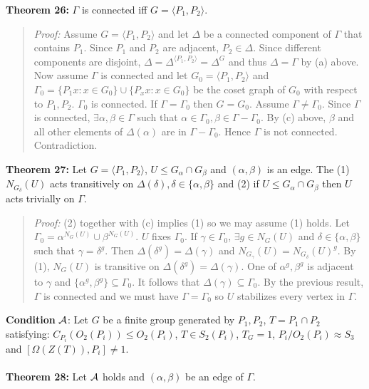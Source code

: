 {\bf Theorem 26:}
$\Gamma$ is connected iff $G= \langle P_1 , P_2 \rangle $.
\begin{quote}
\emph{Proof:}  Assume $G= \langle P_1 , P_2 \rangle$ and let $\Delta$ be a connected component of $\Gamma$ that contains
$P_1$.  Since $P_1$ and $P_2$ are adjacent, $P_2 \in \Delta$.  Since different components are disjoint,
$\Delta = \Delta^{\langle P_1, P_2 \rangle}= \Delta^G$ and thus $\Delta= \Gamma$ by (a) above.
Now assume $\Gamma$ is connected and let $G_0= \langle P_1, P_2 \rangle$ and $\Gamma_0= \{ P_1x: x \in G_0 \} \cup \{ P_xx: x \in G_0 \} $ be the coset graph of $G_0$ with respect to
$P_1, P_2$.  $\Gamma_0$ is connected.  If $\Gamma= \Gamma_0$ then $G= G_0$.  Assume $\Gamma \neq \Gamma_0$.
Since $\Gamma$ is connected, $\exists \alpha, \beta \in \Gamma$ such that $\alpha \in \Gamma_0, \beta \in \Gamma
- \Gamma_0$.  By (c) above, $\beta$ and all other elements of $\Delta( \alpha )$ are in $\Gamma - \Gamma_0$.
Hence $\Gamma$ is not connected.  Contradiction.
\end{quote}
{\bf Theorem 27:}
Let $G= \langle P_1, P_2 \rangle $, $U \le G_{\alpha} \cap G_{\beta}$ and
$(\alpha, \beta)$ is an edge.  The (1) $N_{G_{\delta}}(U)$ acts transitively on
$\Delta(\delta), \delta \in \{ \alpha , \beta \}$ and (2) if $U \le G_{\alpha} \cap G_{\beta}$ then
$U$ acts trivially on $\Gamma$.
\begin{quote}
\emph{Proof:}  (2) together with (c) implies (1) so we may assume (1) holds.
Let $\Gamma_0= \alpha^{N_G(U)} \cup \beta^{N_G(U)}$.  $U$ fixes $\Gamma_0$.
If $\gamma \in \Gamma_0$, $\exists g \in N_G(U)$ and $\delta \in \{ \alpha, \beta \}$ such that
$\gamma= \delta^g$.  Then $\Delta( \delta^g ) = \Delta ( \gamma )$ and $N_{G_{\gamma}}(U)= N_{G_{\delta}}(U)^g $.  By (1), $N_G(U)$ is transitive on $\Delta( \delta^g ) = \Delta( \gamma )$.
One of $\alpha^g, \beta^g$ is adjacent to $\gamma$ and $\{ \alpha^g , \beta^g \} \subseteq \Gamma_0$.
It follows that $\Delta( \gamma ) \subseteq \Gamma_0$.  By the previous result, $\Gamma$ is connected
and we must have $\Gamma= \Gamma_0$ so $U$ stabilizes every vertex in $\Gamma$.
\end{quote}
{\bf Condition} ${\cal A}$:  Let $G$ be a
finite group generated by $P_1, P_2$,
$T= P_1 \cap P_2$ satisfying: $C_{P_i}(O_2(P_i)) \le O_2(P_i)$, $T \in S_2(P_i)$,
$T_G=1$, $P_i/O_2(P_i) \approx S_3$ and $[\Omega(Z(T)), P_i] \ne 1$.
\\
\\
{\bf Theorem 28:}
Let ${\cal A}$ holds and $(\alpha, \beta)$ be an edge of $\Gamma$.
